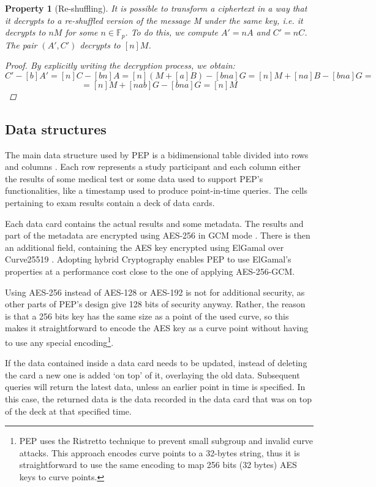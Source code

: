 \documentclass{report}
\newtheorem{property}{Property}
\begin{document}
\begin{property}[Re-shuffling] It is possible to transform a ciphertext in a way that it decrypts to a re-shuffled version of the message M under the same key, i.e. it decrypts to $nM$ for
some $n \in \mathds{F}_p$. To do this, we compute $A'=nA$ and $C'=nC$. The pair $(A', C')$ decrypts to $[n]M$. \newline
\begin{proof}
		By explicitly writing the decryption process, we obtain:
		$$C'-[b]A'=[n]C-[bn]A=[n](M+[a]B)-[bna]G=[n]M+[na]B-[bna]G=$$
		$$=[n]M+[nab]G-[bna]G=[n]M$$
\end{proof}
\end{property}

\subsection{Data structures}\label{data_structures}
The main data structure used by PEP is a bidimensional table divided into rows and columns \cite{pep-blueprint}. Each row represents a study participant and each column either the 
results of some medical test or some data used to support PEP's functionalities, like a timestamp used to produce point-in-time queries. The cells pertaining to exam results contain a 
deck of data cards. \par
Each data card contains the actual results and some metadata. The results and part of the metadata are encrypted using AES-256 \cite{AES-standard} in GCM mode \cite{GCM}. There is then 
an additional field, containing the AES key encrypted using ElGamal over Curve25519 \cite{elliptic-elgamal}. Adopting hybrid Cryptography enables PEP to use ElGamal's properties at a 
performance cost close to the one of applying AES-256-GCM. \par
Using AES-256 instead of AES-128 or AES-192 is not for additional security, as other parts of PEP's design give 128 bits of
security anyway. Rather, the reason is that a 256 bits key has the same size as a point of the used curve, so this makes it straightforward to encode the AES key as a curve point
without having to use any special encoding\footnote{PEP uses the Ristretto technique\cite{ristretto-website} to prevent small subgroup and invalid curve attacks. This approach
encodes curve points to a 32-bytes string, thus it is straightforward to use the same encoding to map 256 bits (32 bytes) AES keys to curve points.}. \par
If the data contained inside a data card needs to be updated, instead of deleting the card a new one is added \enquote*{on top} of it, overlaying the old data. Subsequent queries will
return the latest data, unless an earlier point in time is specified. In this case, the returned data is the data recorded in the data card that was on top of the deck at that specified
time.
\end{document}
